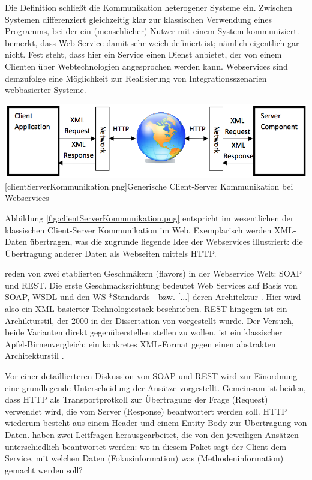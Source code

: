 \documentclass[12pt,a4paper,bibliography=totocnumbered,listof=totoc]{scrartcl}
\begin{document}
Die Definition schließt die Kommunikation heterogener Systeme ein. \glqq Zwischen Systemen\grqq{} differenziert gleichzeitig klar zur klassischen Verwendung eines Programms, bei der ein (menschlicher) Nutzer mit einem System kommuniziert. \citet{tilkov11} bemerkt, dass Web Service damit sehr weich definiert ist; \glqq nämlich eigentlich gar nicht\grqq{}. Fest steht, dass hier ein Service einen Dienst anbietet, der von einem Clienten über Webtechnologien angesprochen werden kann. Webservices sind demzufolge eine Möglichkeit zur Realisierung von Integrationsszenarien webbasierter Systeme.

\vspace{1em}
\begin{minipage}{\linewidth}
	\centering
	\includegraphics[width=0.7\linewidth]{Abbildungen/clientServerKommunikation.png}
	[clientServerKommunikation.png]{Generische Client-Server Kommunikation bei Webservices}
	\label{fig:clientServerKommunikation.png}
\end{minipage}
\vspace{1em}

Abbildung \ref{fig:clientServerKommunikation.png} entspricht im wesentlichen der klassischen Client-Server Kommunikation im Web. Exemplarisch werden XML-Daten übertragen, was die zugrunde liegende Idee der Webservices illustriert: die Übertragung anderer Daten als Webseiten mittels HTTP.

\citet{wilde11} reden von zwei etablierten \glqq Geschmäkern\grqq{} (flavors) in der Webservice Welt: SOAP und REST. Die erste Geschmacksrichtung bedeutet Web Services \glqq auf Basis von SOAP, WSDL und den WS-*Standards - bzw. [...] deren Architektur\grqq{} \citep{tilkov11}. Hier wird also ein XML-basierter Technologiestack beschrieben. REST hingegen ist ein Archikturstil, der 2000 in der Dissertation von \citeauthor{fielding00} vorgestellt wurde. Der Versuch, beide Varianten direkt gegenüberstellen stellen zu wollen, ist ein \glqq [...] klassischer Apfel-Birnenvergleich: ein konkretes XML-Format gegen einen abstrakten Architekturstil\grqq{} \citep{tilkov11}.

Vor einer detaillierteren Diskussion von SOAP und REST wird zur Einordnung eine grundlegende Unterscheidung der Ansätze vorgestellt. Gemeinsam ist beiden, dass HTTP als Transportprotkoll zur Übertragung der Frage (Request) verwendet wird, die vom Server (Response) beantwortert werden soll. HTTP wiederum besteht aus einem Header und einem Entity-Body zur Übertragung von Daten. \citet{richardson07} haben zwei Leitfragen herausgearbeitet, die von den jeweiligen Ansätzen unterschiedlich beantwortet werden: wo in diesem Paket sagt der Client dem Service, mit welchen Daten (Fokusinformation) was (Methodeninformation) gemacht werden soll?
\end{document}
